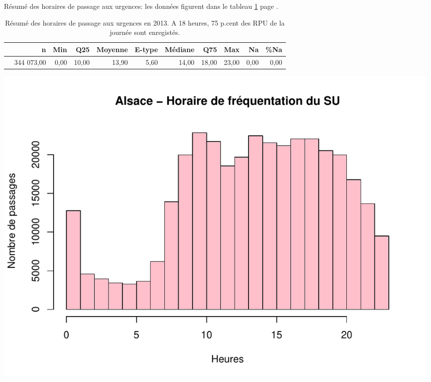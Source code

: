 \documentclass[12pt,english,french,twoside]{book}\usepackage[]{graphicx}\usepackage[]{color}
\makeatletter
\def\maxwidth{ %
  \ifdim\Gin@nat@width>\linewidth
    \linewidth
  \else
    \Gin@nat@width
  \fi
}
\newenvironment{knitrout}{}{} %
\makeatother
\begin{document}
Résumé des horaires de passage aux urgences: les données figurent dans le tableau \ref{tab:24} page \pageref{tab:24}.
\begin{table}[ht]
\centering
\begin{tabular}{rrrrrrrrrrr}
  \hline
 & n & Min & Q25 & Moyenne & E-type & Médiane & Q75 & Max & Na & \%Na \\ 
  \hline
 & 344 073,00 & 0,00 & 10,00 & 13,90 & 5,60 & 14,00 & 18,00 & 23,00 & 0,00 & 0,00 \\ 
   \hline
\end{tabular}
\caption[Horaires de passage]{Résumé des horaires de passage aux urgences en 2013. A 18 heures, 75 p.cent des RPU de la journée sont enregistés.} 
\label{tab:24}
\end{table}


% 

\begin{center}
\begin{knitrout}
\color{fgcolor}
\includegraphics[width=\maxwidth]{figure/test23-1} 

\end{knitrout}
\label{passage:als}
\end{center}
\end{document}
